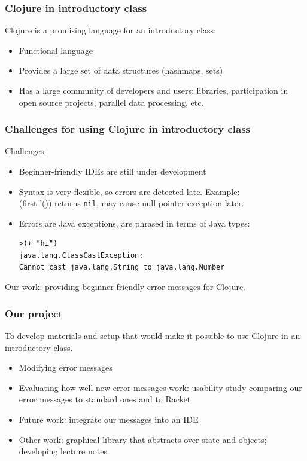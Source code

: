 \documentclass{beamer}
\begin{document}
\begin{frame}
\frametitle{Clojure in introductory class}
Clojure is a promising language for an introductory class:
\begin{itemize}
\item Functional language
\item Provides a large set of data structures (hashmaps, sets)
 \item Has a large community of developers and users: libraries, participation in open source projects, parallel data processing,  etc. 
\end{itemize} 
\end{frame}

\begin{frame}[fragile]
\frametitle{Challenges for using Clojure in introductory class}
Challenges:
\begin{itemize}
\item Beginner-friendly IDEs are still under development
\item Syntax is very flexible, so errors are detected late. Example: \\ 
{(first '())} returns {\tt nil}, may cause null pointer exception later.  
\item Errors are Java exceptions, are phrased in terms of Java types:
\begin{verbatim}
>(+ "hi")
java.lang.ClassCastException: 
Cannot cast java.lang.String to java.lang.Number
\end{verbatim}
\end{itemize}
Our work: providing beginner-friendly error messages for Clojure. 
\end{frame}

\begin{frame}
\frametitle{ Our project}
To develop materials and setup that would make it possible to use Clojure in an introductory class. 
\begin{itemize}
\item Modifying error messages
\item Evaluating how well new error messages work: usability study comparing our error messages to standard ones and to Racket
\item Future work: integrate our messages into an IDE 
\item Other work: graphical library that abstracts over state and objects; developing lecture notes 
\end{itemize}
\end{frame}
\end{document}
